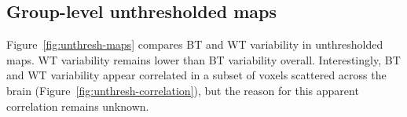 \documentclass[conference]{IEEEtran}
\begin{document}
\subsection{Group-level unthresholded maps}

Figure~\ref{fig:unthresh-maps} compares BT and WT variability in
unthresholded maps. WT variability remains lower than BT variability
overall. Interestingly, BT and WT variability appear correlated in a subset
of voxels scattered across the brain
(Figure~\ref{fig:unthresh-correlation}), but the reason for this apparent
correlation remains unknown.

\begin{figure}[ht]
  \end{figure}
\end{document}
